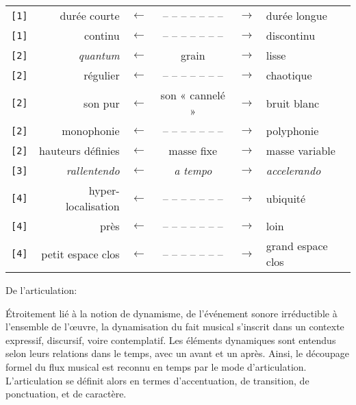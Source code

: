\documentclass{article}
\begin{document}
\begin{longtable}{lrcccl}
\texttt{[1]} & durée courte & $\leftarrow$ & -- -- -- -- -- -- -- & $\rightarrow$ & durée longue \\
\texttt{[1]} & continu & $\leftarrow$ & -- -- -- -- -- -- -- & $\rightarrow$ & discontinu \\
\texttt{[2]} & \textit{quantum} & $\leftarrow$ & grain & $\rightarrow$ & lisse \\
\texttt{[2]} & régulier & $\leftarrow$ & -- -- -- -- -- -- -- & $\rightarrow$ & chaotique \\
\texttt{[2]} & son pur & $\leftarrow$ & son « cannelé » & $\rightarrow$ & bruit blanc \\
\texttt{[2]} & monophonie & $\leftarrow$ & -- -- -- -- -- -- -- & $\rightarrow$ & polyphonie \\
\texttt{[2]} & hauteurs définies & $\leftarrow$ & masse fixe & $\rightarrow$ & masse variable \\
\texttt{[3]} & \textit{rallentendo} & $\leftarrow$ & \textit{a tempo} & $\rightarrow$ & \textit{accelerando} \\
\texttt{[4]} & hyper-localisation & $\leftarrow$ & -- -- -- -- -- -- -- & $\rightarrow$ & ubiquité \\
\texttt{[4]} & près & $\leftarrow$ & -- -- -- -- -- -- -- & $\rightarrow$ & loin \\
\texttt{[4]} & petit espace clos & $\leftarrow$ & -- -- -- -- -- -- -- & $\rightarrow$ & grand espace clos \\
\end{longtable}



\bigskip

De l'articulation:

\smallskip

\noindent Étroitement lié à la notion de dynamisme, 
de l'événement sonore irréductible à l'ensemble de l'œuvre,
la dynamisation du fait musical
s'inscrit dans un contexte expressif, discursif, voire
 contemplatif. 
 Les éléments dynamiques sont entendus selon leurs relations dans le temps, avec un avant et un après.
Ainsi, le découpage formel du flux musical est reconnu en temps par le mode d’articulation.
L'articulation se définit alors en termes d'accentuation, de transition, de ponctuation, et de caractère.
\end{document}
